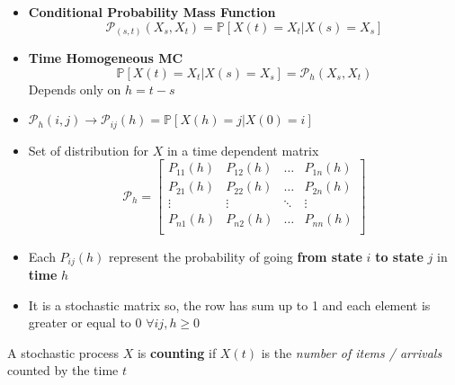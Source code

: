 \begin{itemize}
    \item \textbf{Conditional Probability Mass Function}
    $$\mathcal{P}_{(s,t)}(X_s, X_t) = \mathbb{P}[X(t) = X_t | X(s) = X_s]$$
    \item \textbf{Time Homogeneous MC}
    $$\mathbb{P}[X(t) = X_t | X(s) = X_s] = \mathcal{P}_h(X_s, X_t)$$
    Depends only on $h = t - s$
    \item $\mathcal{P}_h(i,j) \rightarrow \mathcal{P}_{ij}(h) = \mathbb{P}[X(h) = j| X(0)=i]$
    \item Set of distribution for $X$ in a time dependent matrix
    $$
    \mathcal{P}_h = \begin{bmatrix}
    P_{11}(h) & P_{12}(h) & \hdots & P_{1n}(h)\\
    P_{21}(h) & P_{22}(h) & \hdots & P_{2n}(h)\\
    \vdots & \vdots & \ddots & \vdots\\
    P_{n1}(h) & P_{n2}(h) & \hdots & P_{nn}(h)\\
    \end{bmatrix}
    $$
    \item Each $P_{ij}(h)$ represent the probability of going \textbf{from state} $i$ \textbf{to state} $j$ in \textbf{time} $h$
    \item It is a stochastic matrix so, the row has sum up to 1 and each element is greater or equal to 0 $\forall ij,h \geq 0$
\end{itemize}
\begin{tcolorbox}
    A stochastic process $X$ is \textbf{counting} if $X(t)$ is the \textit{number of items / arrivals} counted by the time $t$
\end{tcolorbox}